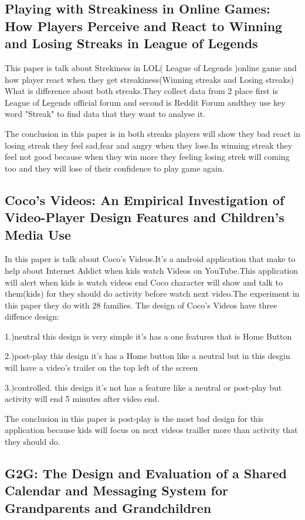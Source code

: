 \subsection{Playing with Streakiness in Online Games: How Players
Perceive and React to Winning and Losing Streaks in
League of Legends }

This paper is talk about Strekiness in LOL( League of Legends )online game and how player react when they get streakiness(Winning streaks and Losing streaks)
What is difference about both streaks.They collect data from 2 place first is League of Legends official forum and second is Reddit Forum andthey use key word "Streak" to find data that they want to analyse it.

The conclusion in this  paper is in both streaks players will show they bad react in losing streak they feel sad,fear and angry when they lose.In winning streak they feel not good because when they win more they feeling 
losing strek will coming too and they will lose of their confidence to play game again.

\subsection{Coco’s Videos: An Empirical Investigation of Video-Player
Design Features and Children's Media Use }

In this paper is talk about Coco's Videos.It's a android application that make to help about Internet Addict when kids watch Videos on YouTube.This application will alert when kids is watch videos end Coco character will show and talk to them(kids) for they should do activity
before watch next video.The experiment in this paper they do with 28 families. The design of Coco's Videos have three diffence design: 

1.)neutral this design is very simple it's has a one features that is Home Button 

2.)post-play this design it's has a Home button like a neutral but in this desgin will have a video's trailer on the top left of the screen 
 
3.)controlled. this design it's not has a feature like a neutral or post-play but activity will end 5 minutes after video end.

The conclusion in this paper is post-play is the most bad design for this application because kids will focus on next videos trailler more than activity that they should do. 


\subsection{G2G: The Design and Evaluation of a Shared Calendar and
Messaging System for Grandparents and Grandchildren }

